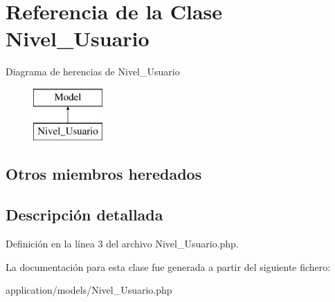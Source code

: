 \hypertarget{class_nivel___usuario}{}\section{Referencia de la Clase Nivel\+\_\+\+Usuario}
\label{class_nivel___usuario}
Diagrama de herencias de Nivel\+\_\+\+Usuario\begin{figure}[H]
\begin{center}
\leavevmode
\includegraphics[height=2.000000cm]{class_nivel___usuario}
\end{center}
\end{figure}
\subsection*{Otros miembros heredados}


\subsection{Descripción detallada}


Definición en la línea 3 del archivo Nivel\+\_\+\+Usuario.\+php.



La documentación para esta clase fue generada a partir del siguiente fichero\+:\begin{DoxyCompactItemize}
\item 
application/models/Nivel\+\_\+\+Usuario.\+php\end{DoxyCompactItemize}
